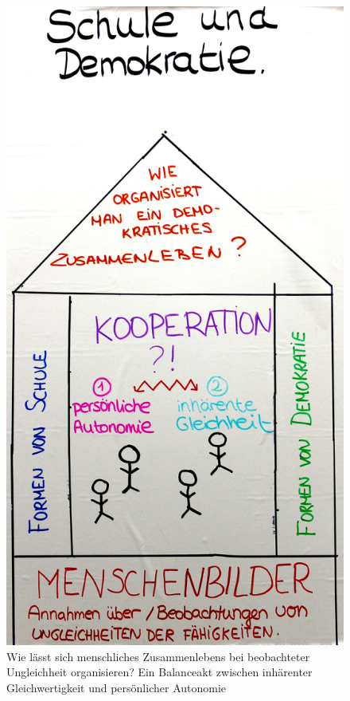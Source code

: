\begin{figure}[htbp]
	\begin{center}
	\includegraphics[width=1\textwidth]{img/Kooperationshaus.JPG}
	\caption{Wie lässt sich menschliches Zusammenlebens bei beobachteter Ungleichheit organisieren? Ein Balanceakt zwischen inhärenter Gleichwertigkeit und persönlicher Autonomie}
	\label{fig:haus}
	\end{center}
\end{figure}

